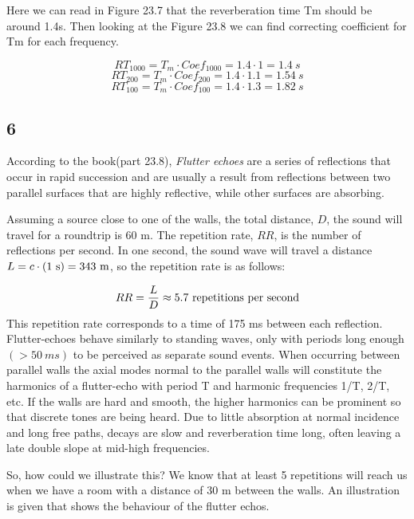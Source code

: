 \documentclass{article}
\begin{document}
Here we can read in Figure 23.7 that the reverberation time Tm should be around 1.4s. Then looking at the Figure 23.8 we can find correcting coefficient for Tm for each frequency.


\begin{equation}
    RT_{1000} = T_{m} \cdot Coef_{1000}  = 1.4 \cdot1 =1.4\ s 
\end{equation}
\begin{equation}
    RT_{200} =  T_{m} \cdot Coef_{200} = 1.4 \cdot1.1 =1.54\ s 
    \end{equation}
    \begin{equation}
    RT_{100} = T_{m} \cdot Coef_{100} = 1.4 \cdot1.3 =1.82\ s 
\end{equation}


\subsection*{6}

According to the book(part 23.8), \textit{Flutter echoes} are a series of reflections that occur in rapid succession and are usually a result from reflections between two parallel surfaces that are highly reflective, while other surfaces are absorbing. 

Assuming a source close to one of the walls, the total distance, $D$, the sound will travel for a roundtrip is 60 m. The repetition rate, $RR$, is the number of reflections per second. In one second, the sound wave will travel a distance $L = c \cdot (1\ {\rm s}) = 343\ {\rm m}$, so the repetition rate is as follows: 

\begin{equation}
    RR = \frac{L}{D} \approx 5.7{\rm \ repetitions\ per\ second}
\end{equation}
This repetition rate corresponds to a time of 175 ms between each reflection.
Flutter-echoes behave similarly to standing waves, only with periods long enough $(>50\ ms)$ to be perceived as separate sound events. When occurring between parallel walls the axial modes normal to the parallel walls will constitute the harmonics of a flutter-echo with period T and harmonic frequencies 1/T, 2/T, etc. If the walls are hard and smooth, the higher harmonics can be prominent so that discrete tones are being heard. Due to little absorption at normal incidence and long free paths, decays are slow and reverberation time long, often leaving a late double slope at mid-high frequencies.

So, how could we illustrate this? We know that at least 5 repetitions will reach us when we have a room with a distance of 30 m between the walls. An illustration is given that shows the behaviour of the flutter echos.
\end{document}
